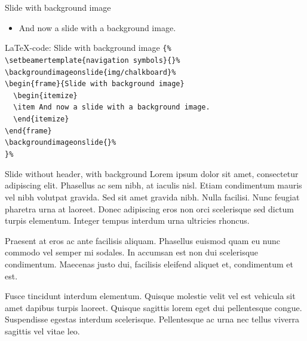 \documentclass[t,11pt]{beamer}
\begin{document}
\begin{frame}{Slide with background image}
\begin{itemize}
\item And now a slide with a background image.
\end{itemize}
\end{frame}
\backgroundimageonslide{}

\toggleslidecolors
\begin{frame}[fragile]{\LaTeX-code: Slide with background image}
\footnotesize
\verb|{%|\\
\verb|\setbeamertemplate{navigation symbols}{}%|\\
\verb|\backgroundimageonslide{img/chalkboard}%|\\
\verb|\begin{frame}{Slide with background image}|\\
\verb|  \begin{itemize}|\\
\verb|  \item And now a slide with a background image.|\\
\verb|  \end{itemize}|\\
\verb|\end{frame}|\\
\verb|\backgroundimageonslide{}%|\\
\verb|}%|\\
\end{frame}
\toggleslidecolors

{
\begin{frame}[plain]{Slide without header, with background}
Lorem ipsum dolor sit amet, consectetur adipiscing elit. Phasellus ac sem nibh, at iaculis nisl. Etiam condimentum mauris vel nibh volutpat gravida. Sed sit amet gravida nibh. Nulla facilisi. Nunc feugiat pharetra urna at laoreet. Donec adipiscing eros non orci scelerisque sed dictum turpis elementum. Integer tempus interdum urna ultricies rhoncus.
\vspace{\baselineskip}

Praesent at eros ac ante facilisis aliquam. Phasellus euismod quam eu nunc commodo vel semper mi sodales. In accumsan est non dui scelerisque condimentum. Maecenas justo dui, facilisis eleifend aliquet et, condimentum et est.
\vspace{\baselineskip}

Fusce tincidunt interdum elementum. Quisque molestie velit vel est vehicula sit amet dapibus turpis laoreet. Quisque sagittis lorem eget dui pellentesque congue. Suspendisse egestas interdum scelerisque. Pellentesque ac urna nec tellus viverra sagittis vel vitae leo.
\end{frame}
\backgroundimageonslide{}
}
\end{document}
